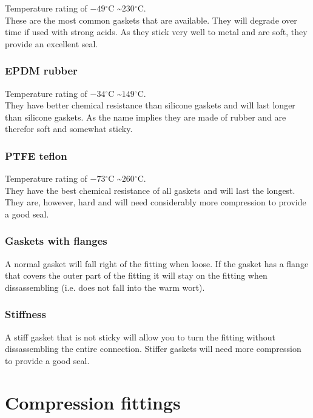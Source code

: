 \documentclass[11pt,fleqn,openany]{book} %
\newcommand{\degree}{\ensuremath{^\circ}}
\begin{document}
Temperature rating of $-49\degree$C \textasciitilde $230\degree$C.\\
These are the most common gaskets that are available. They will degrade over time if used with strong acids. As they stick very well to metal and are soft, they provide an excellent seal.

\subsubsection{EPDM rubber}

Temperature rating of $-34\degree$C \textasciitilde $149\degree$C.\\
They have better chemical resistance than silicone gaskets and will last longer than silicone gaskets. As the name implies they are made of rubber and are therefor soft and somewhat sticky.

\subsubsection{PTFE teflon}

Temperature rating of $-73\degree$C \textasciitilde $260\degree$C.\\
They have the best chemical resistance of all gaskets and will last the longest. They are, however, hard and will need considerably more compression to provide a good seal.

\subsubsection{Gaskets with flanges}

A normal gasket will fall right of the fitting when loose. If the gasket has a flange that covers the outer part of the fitting it will stay on the fitting when dissassembling (i.e. does not fall into the warm wort).

\subsubsection{Stiffness}

A stiff gasket that is not sticky will allow you to turn the fitting without dissassembling the entire connection. Stiffer gaskets will need more compression to provide a good seal.

\section{Compression fittings}
\end{document}
